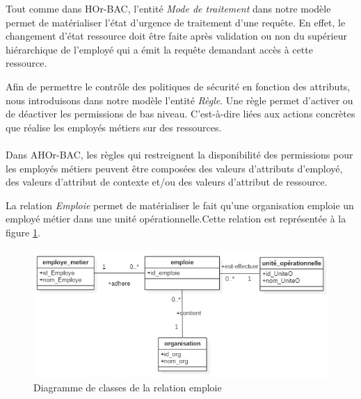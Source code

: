 \label{sectionModeTraitement}

Tout comme dans HOr-BAC, l'entité \textit{Mode de traitement} dans notre modèle permet de matérialiser l'état d'urgence de traitement d'une requête. En effet, le changement d'état ressource doit être faite après validation ou non du supérieur hiérarchique de l'employé qui a émit la requête demandant accès à cette ressource.

\label{sectionRègle}

Afin de permettre le contrôle des politiques de sécurité en fonction des attributs, nous introduisons dans notre modèle l'entité \textit{Règle}. Une règle permet d'activer ou de déactiver les permissions de bas niveau. C'est-à-dire liées aux actions concrètes que réalise les employés métiers sur des ressources. 
\paragraph{} Dans AHOr-BAC, les règles qui restreignent la disponibilité des permissions pour les employés métiers peuvent être composées des valeurs d'attributs d'employé, des valeurs d'attribut de contexte et/ou des valeurs d'attribut de ressource.

\label{sectionRelation} 

\label{sectionEmployeUniteO}

La relation \textit{Emploie} permet de matérialiser le fait qu'une organisation emploie un employé métier dans une unité opérationnelle.Cette relation est représentée à la figure \ref{figemploie}.

\begin{figure}[h!]
    \centering
		\includegraphics[scale=0.7]{chap3/images/emploie.png}
    \caption{Diagramme de classes de la relation emploie}
	 \label{figemploie}
\end{figure} 

